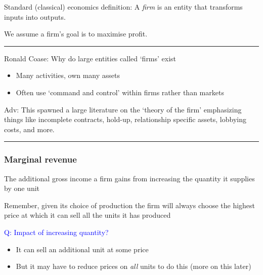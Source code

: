 \documentclass[]{article}
\providecommand{\tightlist}{%
  \setlength{\itemsep}{0pt}\setlength{\parskip}{0pt}}
\begin{document}
Standard (classical) economics definition: A \emph{firm} is an entity
that transforms inputs into outputs.

\bigskip

We assume a firm's goal is to maximise profit.

\begin{center}\rule{0.5\linewidth}{\linethickness}\end{center}

Ronald Coase: Why do large entities called `firms' exist

\bigskip

\begin{itemize}
\tightlist
\item
  Many activities, own many assets
\item
  Often use `command and control' within firms rather than markets
\end{itemize}

Adv: This spawned a large literature on the `theory of the firm'
emphasizing things like incomplete contracts, hold-up, relationship
specific assets, lobbying costs, and more.

\begin{center}\rule{0.5\linewidth}{\linethickness}\end{center}

\hypertarget{marginal-revenue}{%
\subsubsection{Marginal revenue}\label{marginal-revenue}}

\begin{description}
\tightlist
\item[Marginal revenue]
The additional gross income a firm gains from increasing the quantity it
supplies by one unit
\end{description}

Remember, given its choice of production the firm will always choose the
highest price at which it can sell all the units it has produced

\textcolor{blue}{Q: Impact of increasing quantity?}

\bigskip

\begin{itemize}
\tightlist
\item
  It can sell an additional unit at some price
\item
  But it may have to reduce prices on \emph{all} units to do this (more
  on this later)
\end{itemize}
\end{document}
